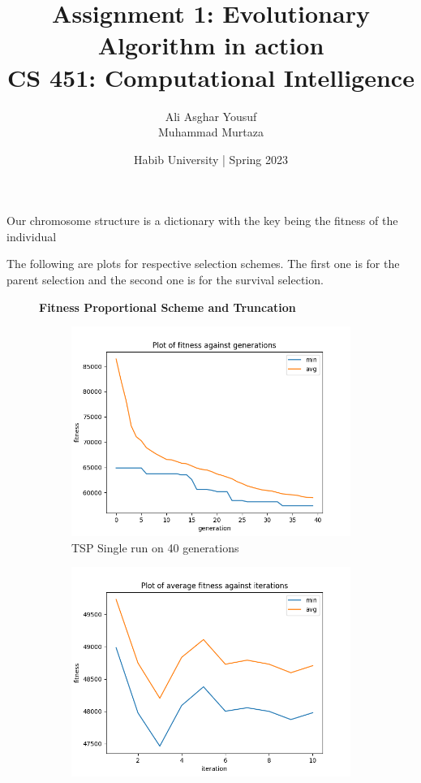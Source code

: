 \documentclass[a4paper]{exam}
\title{Assignment 1: Evolutionary Algorithm in action\\CS 451: Computational Intelligence}
\author{Ali Asghar Yousuf\\Muhammad Murtaza}  %
\date{Habib University | Spring 2023}
\begin{document}
\maketitle

Our chromosome structure is a dictionary with the key being the fitness of the individual
\begin{questions}

  The following are plots for respective selection schemes. The first one is for the parent selection
  and the second one is for the survival selection.

  \begin{figure}[H]
    \centering
    \textbf{Fitness Proportional Scheme and Truncation}
    \begin{subfigure}{.5\textwidth}
      \centering
      \includegraphics[width=1\linewidth]{images/tsp_fps_tn_gen.png}
      \caption{TSP Single run on 40 generations}
      \label{fig:tsp_fps_tn_sub1}
    \end{subfigure}%
    \begin{subfigure}{.5\textwidth}
      \centering
      \includegraphics[width=1\linewidth]{images/tsp_fps_tn_itr.png}

\end{subfigure}
\end{figure}
\end{questions}
\end{document}
